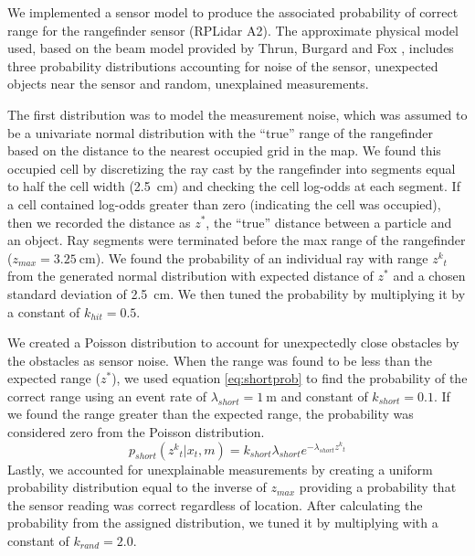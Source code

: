 \documentclass[journal]{IEEEtran}
\begin{document}
            We implemented a sensor model to produce the associated probability of correct range for the rangefinder sensor (RPLidar A2). The approximate physical model used, based on the beam model provided by Thrun, Burgard and Fox \cite{Prob_Rob}, includes three probability distributions accounting for noise of the sensor, unexpected objects near the sensor and random, unexplained measurements.
            
            The first distribution was to model the measurement noise, which was assumed to be a univariate normal distribution with the “true” range of the rangefinder based on the distance to the nearest occupied grid in the map. We found this occupied cell by discretizing the ray cast by the rangefinder into segments equal to half the cell width (\SI{2.5}{\centi\meter}) and checking the cell log-odds at each segment. If a cell contained log-odds greater than zero (indicating the cell was occupied), then we recorded the distance as $z^{*}$, the “true” distance between a particle and an object. Ray segments were terminated before the max range of the rangefinder  ($z_{max}=\SI{3.25}{\centi\meter}$). We found the probability of an individual ray with range $ z{^k}_t $ from the generated normal distribution with expected distance of $z^{*}$ and a chosen standard deviation of \SI{2.5}{\centi\meter}. We then tuned the probability by multiplying it by a constant of $k_{hit}=0.5$.
            
            We created a Poisson distribution to account for unexpectedly close obstacles by the obstacles as sensor noise. When the range was found to be less than the expected range ($z^{*}$), we used equation \ref{eq:shortprob} to find the probability of the correct range using an event rate of $\lambda_{short} = \SI{1}{\meter}$ and constant of $k_{short} =0.1$. If we found the range greater than the expected range, the probability was considered zero from the Poisson distribution.
            \begin{equation}
            	\label{eq:shortprob}
            	p_{short}(z{^k}_t |x_t,m) = k_{short}\lambda_{short}e^{-\lambda_{short}z{^k}_t}
            \end{equation}
            Lastly, we accounted for unexplainable measurements by creating a uniform probability distribution equal to the inverse of $z_{max}$ providing a probability that the sensor reading was correct regardless of location. After calculating the probability from the assigned distribution, we tuned it by multiplying with a constant of $k_{rand}=2.0$.
            
\end{document}
